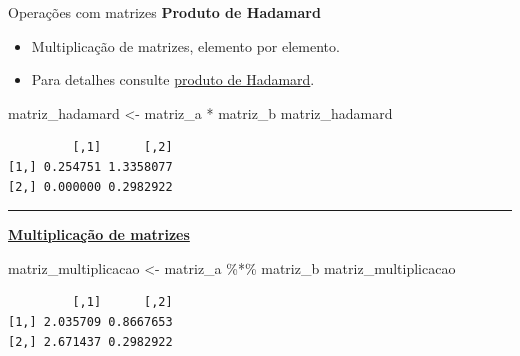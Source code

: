 \documentclass[
  10pt,
  ignorenonframetext,
]{beamer}
\newenvironment{Shaded}{\begin{snugshade}}{\end{snugshade}}
\newcommand{\NormalTok}[1]{\textcolor[rgb]{0.00,0.23,0.31}{#1}}
\newcommand{\OtherTok}[1]{\textcolor[rgb]{0.00,0.23,0.31}{#1}}
\newcommand{\SpecialCharTok}[1]{\textcolor[rgb]{0.37,0.37,0.37}{#1}}
\providecommand{\tightlist}{%
  \setlength{\itemsep}{0pt}\setlength{\parskip}{0pt}}\usepackage{longtable,booktabs,array}
\newcommand*{\regrafina}{\rule{\textwidth}{0.5pt}}
\begin{document}
\begin{frame}[fragile]{Operações com matrizes}
\protect\hypertarget{operauxe7uxf5es-com-matrizes-1}{}
\textbf{Produto de Hadamard}

\begin{itemize}
\tightlist
\item
  Multiplicação de matrizes, elemento por elemento.
\item
  Para detalhes consulte
  \href{https://en.wikipedia.org/wiki/Hadamard_product_(matrices)}{produto
  de Hadamard}.
\end{itemize}

\begin{Shaded}
\begin{Highlighting}[]
\NormalTok{matriz\_hadamard }\OtherTok{\textless{}{-}}\NormalTok{ matriz\_a }\SpecialCharTok{*}\NormalTok{ matriz\_b}
\NormalTok{matriz\_hadamard}
\end{Highlighting}
\end{Shaded}

\begin{verbatim}
         [,1]      [,2]
[1,] 0.254751 1.3358077
[2,] 0.000000 0.2982922
\end{verbatim}

\regrafina

\href{https://pt.wikipedia.org/wiki/Matriz_inversa}{\textbf{Multiplicação
de matrizes}}

\begin{Shaded}
\begin{Highlighting}[]
\NormalTok{matriz\_multiplicacao }\OtherTok{\textless{}{-}}\NormalTok{ matriz\_a }\SpecialCharTok{\%*\%}\NormalTok{ matriz\_b}
\NormalTok{matriz\_multiplicacao}
\end{Highlighting}
\end{Shaded}

\begin{verbatim}
         [,1]      [,2]
[1,] 2.035709 0.8667653
[2,] 2.671437 0.2982922
\end{verbatim}
\end{frame}
\end{document}
